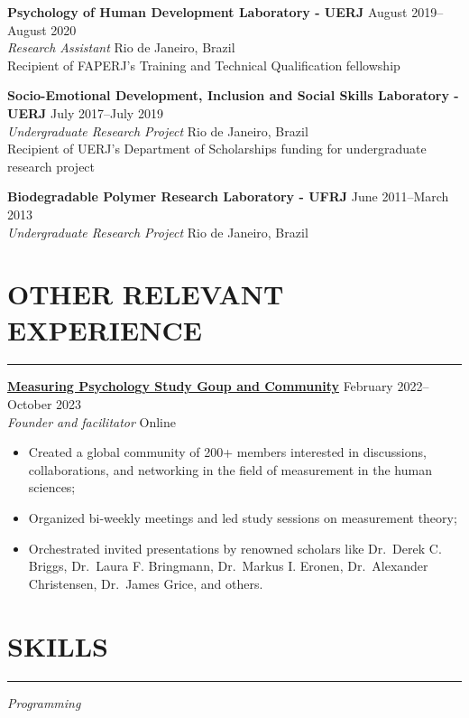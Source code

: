 \documentclass[10pt,]{article}
\providecommand{\tightlist}{%
  \setlength{\itemsep}{0pt}\setlength{\parskip}{0pt}}
\begin{document}
\textbf{Psychology of Human Development Laboratory - UERJ} \hfill August
2019--August 2020\\
\emph{Research Assistant} \hfill Rio de Janeiro, Brazil\\
Recipient of FAPERJ's Training and Technical Qualification fellowship

\textbf{Socio-Emotional Development, Inclusion and Social Skills
Laboratory - UERJ} \hfill July 2017--July 2019\\
\emph{Undergraduate Research Project} \hfill Rio de Janeiro, Brazil\\
Recipient of UERJ's Department of Scholarships funding for undergraduate
research project

\textbf{Biodegradable Polymer Research Laboratory - UFRJ} \hfill June
2011--March 2013\\
\emph{Undergraduate Research Project} \hfill Rio de Janeiro, Brazil

\section{OTHER RELEVANT EXPERIENCE}\label{other-relevant-experience}

\hrule

\textbf{\href{https://measuringpsychology.netlify.app/}{Measuring
Psychology Study Goup and Community}} \hfill February 2022--October
2023\\
\emph{Founder and facilitator} \hfill Online

\begin{itemize}
\tightlist
\item
  Created a global community of 200+ members interested in discussions,
  collaborations, and networking in the field of measurement in the
  human sciences;
\item
  Organized bi-weekly meetings and led study sessions on measurement
  theory;
\item
  Orchestrated invited presentations by renowned scholars like Dr.~Derek
  C. Briggs, Dr.~Laura F. Bringmann, Dr.~Markus I. Eronen, Dr.~Alexander
  Christensen, Dr.~James Grice, and others.
\end{itemize}

\section{SKILLS}\label{skills}

\hrule

\emph{Programming}
\end{document}
